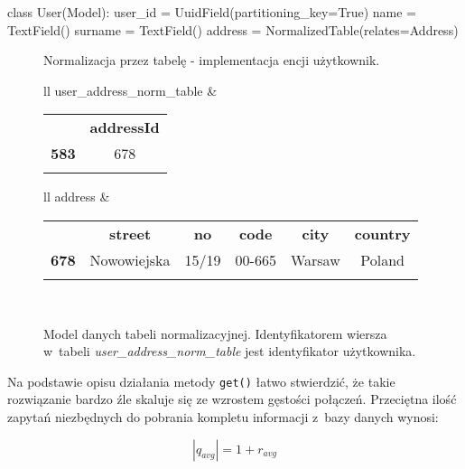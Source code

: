 \begin{verbbox}[\footnotesize]
class User(Model):
    user_id = UuidField(partitioning_key=True)
    name = TextField()
    surname = TextField()
    address = NormalizedTable(relates=Address)
\end{verbbox}

\begin{figure}[ht!]
	\centering
	\theverbbox
	\caption{Normalizacja przez tabelę - implementacja encji użytkownik.}
	\label{lst:normalization_by_table_example}
\end{figure}

\begin{figure}[ht!]
	\centering

	\begin{tabular}{ll}
		user\_address\_norm\_table &
		\begin{tabular}{|l||c|}
			\hhline{|-||-|}
		 	& \textbf{addressId} \\
			\hhline{|~||=|}
			\textbf{583} & 678 \\
			\hhline{|-||-|}
		\end{tabular} 	
	\end{tabular}
	
	\vspace{1em}

	\begin{tabular}{ll}
		address &
		\begin{tabular}{|l||c|c|c|c|c|}
			\hhline{|-||-----|}
		 	& \textbf{street} & \textbf{no} & \textbf{code} & \textbf{city} & \textbf{country} \\
			\hhline{|~||=====|}
			\textbf{678} & Nowowiejska & 15/19 & 00-665 & Warsaw & Poland \\
			\hhline{|-||-----|}
		\end{tabular} \\
	\end{tabular}

	\caption{Model danych tabeli normalizacyjnej. Identyfikatorem wiersza w~tabeli \emph{user\_address\_norm\_table} jest identyfikator użytkownika.}
	\label{tab:address_normalization_table_data_model}
\end{figure}

Na podstawie opisu działania metody \verb+get()+ łatwo stwierdzić, że takie rozwiązanie bardzo źle skaluje się ze wzrostem gęstości połączeń. Przeciętna ilość zapytań niezbędnych do pobrania kompletu informacji z~bazy danych wynosi:

\begin{equation}
|q_{avg}| = 1 + r_{avg}
\end{equation}

